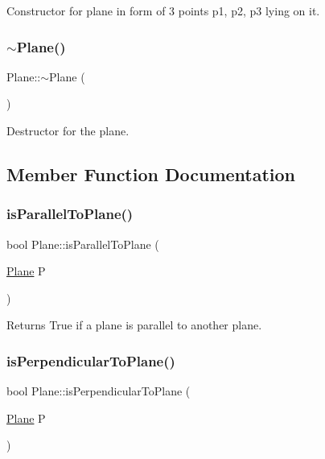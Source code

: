 Constructor for plane in form of 3 points p1, p2, p3 lying on it. 

\mbox{\label{class_plane_a69abd86051c880dcb44b249ad10c4436}} 
\subsubsection{\texorpdfstring{$\sim$\+Plane()}{~Plane()}}
{\footnotesize\ttfamily Plane\+::$\sim$\+Plane (\begin{DoxyParamCaption}{ }\end{DoxyParamCaption})}



Destructor for the plane. 



\subsection{Member Function Documentation}
\mbox{\label{class_plane_ab00163f615128de1c6bddd2169995e0a}} 
\subsubsection{\texorpdfstring{is\+Parallel\+To\+Plane()}{isParallelToPlane()}}
{\footnotesize\ttfamily bool Plane\+::is\+Parallel\+To\+Plane (\begin{DoxyParamCaption}\item[{\mbox{\hyperlink{class_plane}{Plane}}}]{P }\end{DoxyParamCaption})}



Returns True if a plane is parallel to another plane. 

\mbox{\label{class_plane_a6b175c15e8964820c56686aa19bf18e8}} 
\subsubsection{\texorpdfstring{is\+Perpendicular\+To\+Plane()}{isPerpendicularToPlane()}}
{\footnotesize\ttfamily bool Plane\+::is\+Perpendicular\+To\+Plane (\begin{DoxyParamCaption}\item[{\mbox{\hyperlink{class_plane}{Plane}}}]{P }\end{DoxyParamCaption})}



